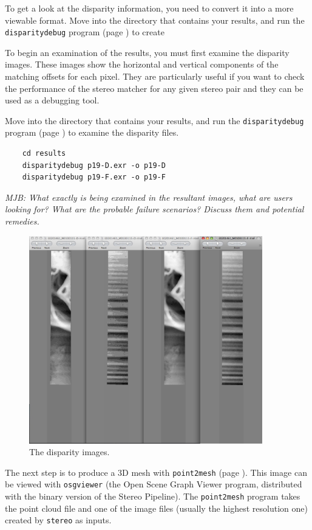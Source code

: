 To get a look at the disparity information, you need to convert it
into a more viewable format.  Move into the directory that contains
your results, and  run the \texttt{disparitydebug} program (page
\pageref{disparitydebug}) to create


To begin an examination of the results, you must first examine the
disparity images. These images show the horizontal and vertical
components of the matching offsets for each pixel. They are
particularly useful if you want to check the performance of the
stereo matcher for any given stereo pair and they can be used as a
debugging tool.

Move into the directory that contains your results, and run the
\texttt{disparitydebug} program (page \pageref{disparitydebug}) to
examine the disparity files.

\begin{verbatim}
    cd results
    disparitydebug p19-D.exr -o p19-D     
    disparitydebug p19-F.exr -o p19-F
\end{verbatim}

\emph{MJB: What exactly is being examined in the resultant images, what are users looking for?  What are the probable failure scenarios?  Discuss them and potential remedies.}


\begin{figure}
\begin{center}
\includegraphics[width=4in]{images/p19-disparity.png}
\caption[P19 disparity images]{
    \label{p19-disparity}
	The disparity images.
    }
\end{center}
\end{figure}

The next step is to produce a 3D mesh with \texttt{point2mesh} (page
\pageref{point2mesh}).  This image can be viewed with \texttt{osgviewer}
(the Open Scene Graph Viewer program, distributed with the binary version
of the Stereo Pipeline).  The \texttt{point2mesh} program takes the
point cloud file and one of the image files (usually the highest
resolution one) created by \texttt{stereo} as inputs.

